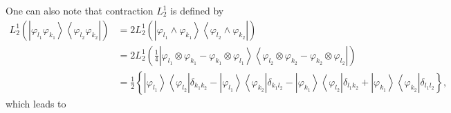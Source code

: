 \documentclass[aps,preprint]{revtex4}%
\begin{document}
One can also note that contraction $L_{2}^{1}$ is defined by
\begin{align*}
L_{2}^{1}\left(  \left\vert \varphi_{l_{1}}\varphi_{k_{1}}\right\rangle
\left\langle \varphi_{l_{2}}\varphi_{k_{2}}\right\vert \right)   &
=2L_{2}^{1}\left(  \left\vert \varphi_{l_{1}}\wedge\varphi_{k_{1}%
}\right\rangle \left\langle \varphi_{l_{2}}\wedge\varphi_{k_{2}}\right\vert
\right) \\
&  =2L_{2}^{1}\left(  \frac{1}{4}\left\vert \varphi_{l_{1}}\otimes
\varphi_{k_{1}}-\varphi_{k_{1}}\otimes\varphi_{l_{1}}\right\rangle
\left\langle \varphi_{l_{2}}\otimes\varphi_{k_{2}}-\varphi_{k_{2}}%
\otimes\varphi_{l_{2}}\right\vert \right) \\
&  =\frac{1}{2}\left\{  \left\vert \varphi_{l_{1}}\right\rangle \left\langle
\varphi_{l_{2}}\right\vert \delta_{k_{1}k_{2}}-\left\vert \varphi_{l_{1}%
}\right\rangle \left\langle \varphi_{k_{2}}\right\vert \delta_{k_{1}l_{2}%
}-\left\vert \varphi_{k_{1}}\right\rangle \left\langle \varphi_{l_{2}%
}\right\vert \delta_{l_{1}k_{2}}+\left\vert \varphi_{k_{1}}\right\rangle
\left\langle \varphi_{k_{2}}\right\vert \delta_{l_{1}l_{2}}\right\}  ,
\end{align*}
which leads to
\end{document}
